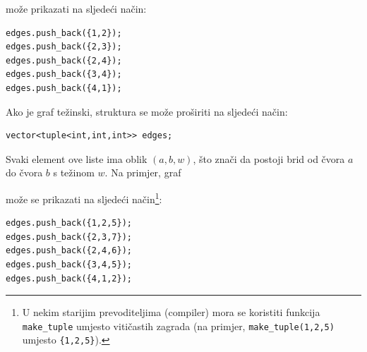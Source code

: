\begin{center}
\end{center}
može prikazati na sljedeći način:
\begin{lstlisting}
edges.push_back({1,2});
edges.push_back({2,3});
edges.push_back({2,4});
edges.push_back({3,4});
edges.push_back({4,1});
\end{lstlisting}

\noindent
Ako je graf težinski, struktura se može
proširiti na sljedeći način:
\begin{lstlisting}
vector<tuple<int,int,int>> edges;
\end{lstlisting}
Svaki element ove liste ima
oblik $(a,b,w)$, što znači da
postoji brid od čvora $a$ do čvora $b$ s težinom $w$.
Na primjer, graf

\begin{center}
\end{center}
\begin{samepage}
može se prikazati na sljedeći način\footnote{U nekim starijim prevoditeljima (compiler) mora se
koristiti funkcija \texttt{make\_tuple} umjesto vitičastih zagrada (na primjer,
\texttt{make\_tuple(1,2,5)} umjesto \texttt{\{1,2,5\}}).}:
\begin{lstlisting}
edges.push_back({1,2,5});
edges.push_back({2,3,7});
edges.push_back({2,4,6});
edges.push_back({3,4,5});
edges.push_back({4,1,2});
\end{lstlisting}
\end{samepage}
